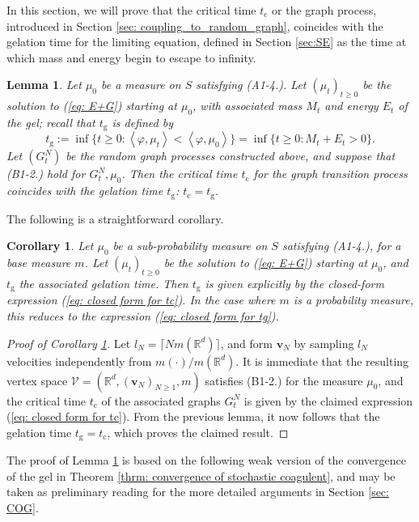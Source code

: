 \documentclass[11pt, notitlepage]{article}
\newtheorem{lem}[thm]{Lemma}
\newtheorem{cor}[thm]{Corollary}
\begin{document}
In this section, we will prove that the critical time $t_\mathrm{c}$ or the graph process, introduced in Section \ref{sec: coupling_to_random_graph}, coincides with the gelation time for the limiting equation, defined in Section \ref{sec:SE} as the time at which mass and energy begin to escape to infinity. 
\begin{lem}\label{lemma: connect critical times} Let $\mu_0$ be a measure on $S$ satisfying ({A1-4}.). Let $(\mu_t)_{t\ge 0}$ be the solution to (\ref{eq: E+G}) starting at $\mu_0$, with associated mass $M_t$ and energy $E_t$ of the gel; recall that $t_\mathrm{g}$ is defined by \begin{equation}
    t_\mathrm{g}:=\inf\{t\ge 0: \left<\varphi, \mu_t\right> < \left<\varphi, \mu_0\right>\} 
    = \inf\{t\ge 0: M_t+E_t>0\}.
\end{equation} Let $(G^N_t)$ be the random graph processes constructed above, and suppose that (B1-2.) hold for $G^N_t, \mu_0$. Then the critical time $t_\mathrm{c}$ for the graph transition process coincides with the gelation time $t_\mathrm{g}$: $ t_\mathrm{c}=t_\mathrm{g}. $ \end{lem} The following is a straightforward corollary. \begin{cor}\label{corr: actual expression for tg} Let $\mu_0$ be a sub-probability measure on $S$ satisfying (A1-4.), for a base measure $m$. Let $(\mu_t)_{t\ge 0}$ be the solution to (\ref{eq: E+G}) starting at $\mu_0$, and $t_\mathrm{g}$ the associated gelation time. Then $t_\mathrm{g}$ is given explicitly by the closed-form expression (\ref{eq: closed form for tc}). In the case where $m$ is a probability measure, this reduces to the expression (\ref{eq: closed form for tg}).   \end{cor} \begin{proof}[Proof of Corollary \ref{corr: actual expression for tg}] Let $l_N=\lceil N m(\mathbb{R}^d)\rceil$, and form $\mathbf{v}_N$ by sampling $l_N$ velocities independently from $m(\cdot)/m(\mathbb{R}^d).$ It is immediate that the resulting vertex space $\mathcal{V}=(\mathbb{R}^d, (\mathbf{v}_N)_{N\ge 1}, m)$ satisfies (B1-2.) for the measure $\mu_0$, and the critical time $t_\mathrm{c}$ of the associated graphs $G^N_t$ is given by the claimed expression (\ref{eq: closed form for tc}). From the previous lemma, it now follows that the gelation time $t_\mathrm{g}=t_\mathrm{c}$, which proves the claimed result. \end{proof} 
The proof of Lemma \ref{lemma: connect critical times} is based on the following weak version of the convergence of the gel in Theorem \ref{thrm: convergence of stochastic coagulent}, and may be taken as preliminary reading for the more detailed arguments in Section \ref{sec: COG}.
\end{document}
